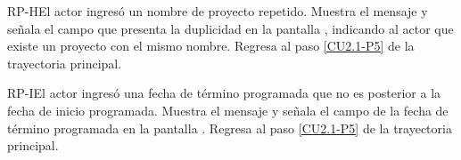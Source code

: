 	\begin{UCtrayectoriaA}{RP-H}{El actor ingresó un nombre de proyecto repetido.}
		\UCpaso[\UCsist] Muestra el mensaje  y señala el campo que presenta la duplicidad en la pantalla , indicando al actor que existe un proyecto con el mismo nombre.
		\UCpaso Regresa al paso \ref{CU2.1-P5} de la trayectoria principal.
	\end{UCtrayectoriaA}

	\begin{UCtrayectoriaA}{RP-I}{El actor ingresó una fecha de término programada que no es posterior a la fecha de inicio programada.}
		\UCpaso[\UCsist] Muestra el mensaje  y señala el campo de la fecha de término programada en la pantalla .
		\UCpaso Regresa al paso \ref{CU2.1-P5} de la trayectoria principal.
	\end{UCtrayectoriaA}